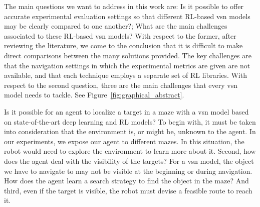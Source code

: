 The main questions we want to address in this work are: Is it possible to offer accurate experimental evaluation settings so that different RL-based \acrshort{vsn} models may be clearly compared to one another?; What are the main challenges associated to these RL-based \acrshort{vsn} models?
With respect to the former, after reviewing the literature, we come to the conclusion that it is difficult to make direct comparisons between the many solutions provided.
The key challenges are that the navigation settings in which the experimental metrics are given are not available, and that each technique employs a separate set of RL libraries.
With respect to the second question, three are the main challenges that every \acrshort{vsn} model needs to tackle.
See Figure~\ref{fig:graphical_abstract}.

Is it possible for an agent to localize a target in a maze with a \acrshort{vsn} model based on state-of-the-art deep learning and RL models?
To begin with, it must be taken into consideration that the environment is, or might be, unknown to the agent.
In our experiments, we expose our agent to different mazes.
In this situation, the robot would need to explore the environment to learn more about it.
Second, how does the agent deal with the visibility of the targets?
For a \acrshort{vsn} model, the object we have to navigate to may not be visible at the beginning or during navigation.
How does the agent learn a search strategy to find the object in the maze?
And third, even if the target is visible, the robot must devise a feasible route to reach it.

